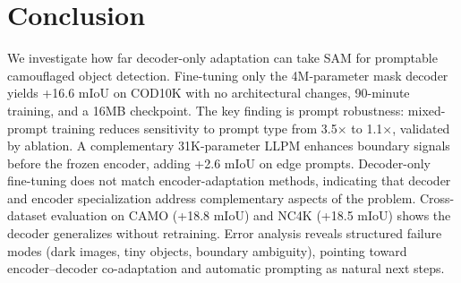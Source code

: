 \section{Conclusion}

We investigate how far decoder-only adaptation can take SAM for promptable camouflaged object detection. Fine-tuning only the 4M-parameter mask decoder yields +16.6 mIoU on COD10K with no architectural changes, 90-minute training, and a 16MB checkpoint. The key finding is prompt robustness: mixed-prompt training reduces sensitivity to prompt type from 3.5$\times$ to 1.1$\times$, validated by ablation. A complementary 31K-parameter LLPM enhances boundary signals before the frozen encoder, adding +2.6 mIoU on edge prompts. Decoder-only fine-tuning does not match encoder-adaptation methods, indicating that decoder and encoder specialization address complementary aspects of the problem. Cross-dataset evaluation on CAMO (+18.8 mIoU) and NC4K (+18.5 mIoU) shows the decoder generalizes without retraining. Error analysis reveals structured failure modes (dark images, tiny objects, boundary ambiguity), pointing toward encoder--decoder co-adaptation and automatic prompting as natural next steps.
